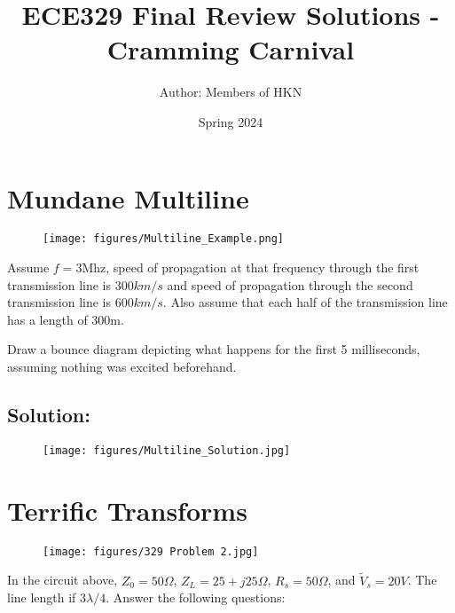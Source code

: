 \documentclass{article}
\title{ECE329 Final Review Solutions - Cramming Carnival}
\author{Author: Members of HKN}
\date{Spring 2024}
\begin{document}
\maketitle

\section{Mundane Multiline}

\begin{figure}[h]
\begin{center}
    \texttt{[image: figures/Multiline\_Example.png]}
\end{center}
\end{figure}

Assume $f = 3$Mhz, speed of propagation at that frequency through the first transmission line is $300 km/s$ and speed of propagation through the second transmission line is $600 km/s$. Also assume that each half of the transmission line has a length of 300m.

Draw a bounce diagram depicting what happens for the first 5 milliseconds, assuming nothing was excited beforehand.

\subsection{Solution:}

\begin{figure}[H]
\begin{center}
    \texttt{[image: figures/Multiline\_Solution.jpg]}
\end{center}
\end{figure}

\newpage

\section{Terrific Transforms}

\begin{figure}[H]
\begin{center}
    \texttt{[image: figures/329 Problem 2.jpg]}
\end{center}
\end{figure}

In the circuit above, $Z_0 = 50 \Omega$, $Z_L = 25 + j25 \Omega$, $R_s = 50 \Omega$, and $\tilde{V}_s = 20 V$. The line length if $3 \lambda / 4$. Answer the following questions:
\end{document}
